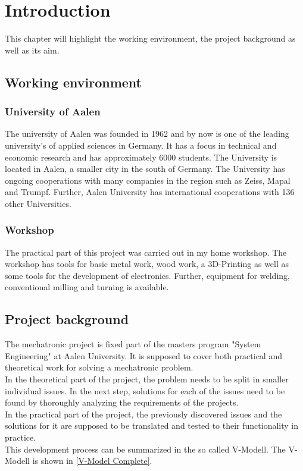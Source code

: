 \chapter{Introduction}
\label{introductio}

This chapter will highlight the working environment, the project background as well as its aim.
 
\section{Working environment}
 
\subsection{University of Aalen}
The university of Aalen was founded in 1962 and by now is one of the leading university's of applied sciences in Germany. It has a focus in technical and economic research and has approximately 6000 students.
The University is located in Aalen, a smaller city in the south of Germany. The University has ongoing cooperations with many companies in the region such as Zeiss, Mapal and Trumpf. Further, Aalen University has international cooperations with 136 other Universities.\cite{Aalen}
 
\subsection{Workshop}
The practical part of this project was carried out in my home workshop. The workshop has tools for basic metal work, wood work, a 3D-Printing as well as some tools for the development of electronics. Further, equipment for welding, conventional milling and turning is available.
 
 
\section{Project background}
The mechatronic project is fixed part of the masters program "System Engineering" at Aalen University. It is supposed to cover both practical and theoretical work for solving a mechatronic problem.\\
In the theoretical part of the project, the problem needs to be split in smaller individual issues. In the next step, solutions for each of the issues need to be found by thoroughly analyzing the requirements of the projects.\\
In the practical part of the project, the previously discovered issues and the solutions for it are supposed to be translated and tested to their functionality in practice.\\
This development process can be summarized in the so called V-Modell. The V-Modell is shown in \ref{V-Model Complete}.
 

